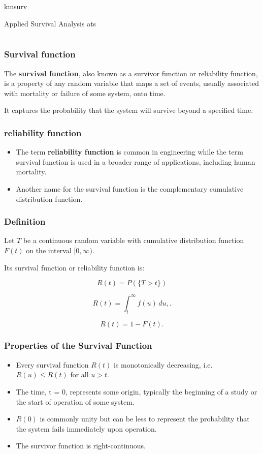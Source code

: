 \documentclass[]{beamer}
\begin{document}
kmsurv

Applied Survival Analysis
ats



\section{}
\begin{frame}
\frametitle{Survival function}
\Large
The \textbf{survival function}, also known as a survivor function or reliability function, is a property of 
any random variable that maps a set of events, usually associated with mortality or failure of 
some system, onto time. 

\vspace{0.3cm}
It captures the probability that the system will survive 
beyond a specified time.
\end{frame}
\begin{frame}
\frametitle{reliability function}\Large
\begin{itemize}
\item The term \textbf{reliability function} is common in engineering while the term survival function 
is used in a broader range of applications, including human mortality. 
\item Another name for the survival function is the complementary cumulative distribution function.
\end{itemize}
\end{frame}
\begin{frame}
\frametitle{Definition}
\Large
Let $T$ be a continuous random variable with cumulative distribution function $F(t)$ on the interval $[0,\infty)$. 

Its survival function or reliability function is:

\[R(t) = P(\{T > t\})\]

\[R(t) = \int_t^{\infty} f(u)\,du,.\]

\[R(t) =  1-F(t).\]

\end{frame}
\begin{frame}
\frametitle{Properties of the Survival Function}
\Large
\begin{itemize}
\item Every survival function $R(t)$ is monotonically decreasing, i.e. $R(u) \le R(t)$ for all $u > t$.
\item The time, t = 0, represents some origin, typically the beginning of a study or the start of operation of some system. 
\item $R(0)$ is commonly unity but can be less to represent the probability that the system fails immediately upon operation.
\item The survivor function is right-continuous.
\end{itemize}

\end{frame}
\end{document}
